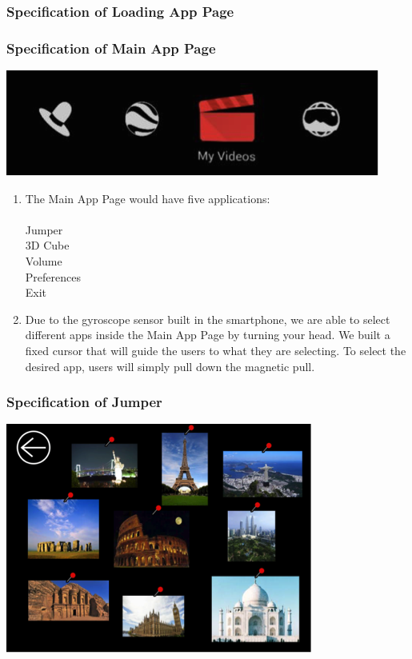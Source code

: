 \documentclass[12pt]{article}
\begin{document}
\subsubsection{Specification of Loading App Page}

\newpage
\subsubsection{Specification of Main App Page}
\includegraphics{Main}
\begin{enumerate}
\item The Main App Page would have five applications:\\ \\
 Jumper\\
 3D Cube\\
 Volume\\
 Preferences\\
 Exit\\
\item Due to the gyroscope sensor built in the smartphone, we are able to select different apps inside the Main App Page by turning your head. We built a fixed cursor that will guide the users to what they are selecting. To select the desired app, users will simply pull down the magnetic pull.
\end{enumerate}

\subsubsection{Specification of Jumper}
\includegraphics{Jumper}
\end{document}
